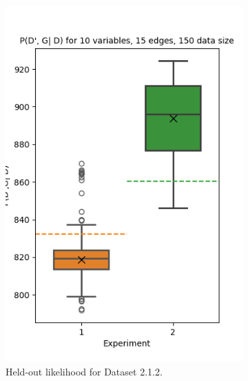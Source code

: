 \documentclass{lxaiproposal}
\begin{document}
\begin{figure}[h]
\begin{subfigure}{0.32\textwidth}
            \includegraphics[width=\textwidth]{figures/P_d_prime_10_15_150}
            \caption{Held-out likelihood for Dataset 2.1.2.}
            \label{fig:p_d_10_15_150}
        \end{subfigure}
        \begin{subfigure}{0.32\textwidth}
            \centering

\end{subfigure}
\end{figure}
\end{document}
